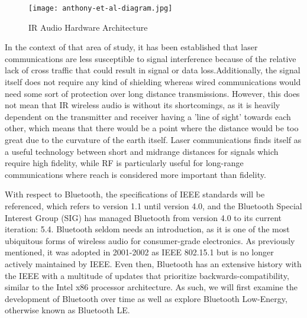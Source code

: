 \documentclass[conference]{IEEEtran}
\begin{document}
\begin{figure}[htbp]
    \centering
    \texttt{[image: anthony-et-al-diagram.jpg]}
    \caption{IR Audio Hardware Architecture \cite{anthony_approach_2021}}
    \label{fig:IR_hardware}
\end{figure}

In the context of that area of study, it has been established that laser communications are
less susceptible to signal interference because of the relative lack of cross traffic that
could result in signal or data loss.Additionally, the signal itself does not require any kind
of shielding whereas wired communications would need some sort of protection over long
distance transmissions. However, this does not mean that IR wireless audio is without its
shortcomings, as it is heavily dependent on the transmitter and receiver having a 'line of
sight' towards each other, which means that there would be a point where the distance would
be too great due to the curvature of the earth itself. Laser communications finds itself as a
useful technology between short and midrange distances for signals which require high
fidelity, while RF is particularly useful for long-range communications where reach is
considered more important than fidelity.\cite{anthony_approach_2021}

With respect to Bluetooth, the specifications of IEEE standards will be referenced, which
refers to version 1.1 until version 4.0, and the Bluetooth Special Interest Group (SIG) has
managed Bluetooth from version 4.0 to its current iteration: 5.4. Bluetooth seldom needs an
introduction, as it is one of the most ubiquitous forms of wireless audio for consumer-grade
electronics. As previously mentioned, it was adopted in 2001-2002 as IEEE 802.15.1 but is no
longer actively maintained by IEEE.\cite{bhalla_unraveling_2021} Even then, Bluetooth has an
extensive history with the IEEE with a multitude of updates that prioritize
backwards-compatibility, similar to the Intel x86 processor architecture.
\cite{noauthor_bluetooth_nodate} As such, we will first examine the development of Bluetooth
over time as well as explore Bluetooth Low-Energy, otherwise known as Bluetooth LE.
\cite{bhalla_unraveling_2021}
\end{document}
